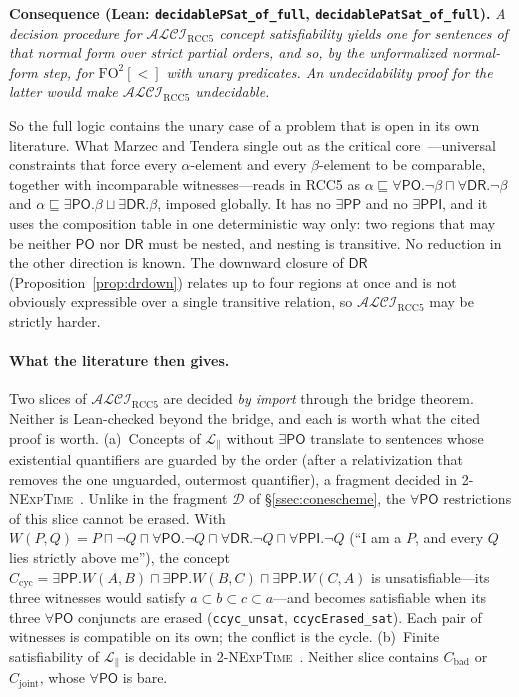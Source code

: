 \documentclass[11pt]{article}
\newcommand{\ALCIRCC}[1]{\mathcal{ALCI}_{\mathrm{RCC#1}}}
\newcommand{\DR}{\mathsf{DR}}
\newcommand{\PO}{\mathsf{PO}}
\newcommand{\PP}{\mathsf{PP}}
\newcommand{\PPI}{\mathsf{PPI}}
\newcommand{\code}[1]{\texttt{#1}}
\theoremstyle{plain}
\theoremstyle{definition}
\begin{document}
\medskip\noindent\textbf{Consequence (Lean:
\code{decidablePSat\_of\_full}, \code{decidablePatSat\_of\_full}).}
\emph{A decision procedure for $\ALCIRCC5$ concept satisfiability yields one
for sentences of that normal form over strict partial orders, and so, by the
unformalized normal-form step, for $\mathrm{FO}^2[<]$ with unary predicates.
An undecidability proof for the latter would make $\ALCIRCC5$
undecidable.}\medskip

So the full logic contains the unary case of a problem that is open in its own
literature. What Marzec and Tendera single out as the critical
core~\cite{MarzecTendera2026}---universal constraints that force every
$\alpha$-element and every $\beta$-element to be comparable, together with
incomparable witnesses---reads in RCC5 as
$\alpha\sqsubseteq\forall\PO.\neg\beta\sqcap\forall\DR.\neg\beta$ and
$\alpha\sqsubseteq\exists\PO.\beta\sqcup\exists\DR.\beta$, imposed globally. It
has no $\exists\PP$ and no $\exists\PPI$, and it uses the composition table in
one deterministic way only: two regions that may be neither $\PO$ nor $\DR$
must be nested, and nesting is transitive. No reduction in the other direction
is known. The downward closure of $\DR$ (Proposition~\ref{prop:drdown})
relates up to four regions at once and is not obviously expressible over a single
transitive relation, so $\ALCIRCC5$ may be strictly harder.

\paragraph{What the literature then gives.} Two slices of $\ALCIRCC5$ are
decided \emph{by import} through the bridge theorem. Neither is
Lean-checked beyond the bridge, and each is worth what the cited proof is
worth. (a)~Concepts of $\mathcal L_{\parallel}$ without $\exists\PO$ translate
to sentences whose existential quantifiers are guarded by the order (after a
relativization that removes the one unguarded, outermost quantifier), a
fragment decided in 2-\textsc{NExpTime}~\cite{SzwastTendera2018}. Unlike in the
fragment $\mathcal D$ of \S\ref{ssec:conescheme}, the $\forall\PO$
restrictions of this slice cannot be erased. With
$W(P,Q)=P\sqcap\neg Q\sqcap\forall\PO.\neg Q\sqcap\forall\DR.\neg Q\sqcap
\forall\PPI.\neg Q$ (``I am a $P$, and every $Q$ lies strictly above me''),
the concept
$C_{\mathrm{cyc}}=\exists\PP.W(A,B)\sqcap\exists\PP.W(B,C)\sqcap
\exists\PP.W(C,A)$ is unsatisfiable---its three witnesses would satisfy
$a\subset b\subset c\subset a$---and becomes satisfiable when its three
$\forall\PO$ conjuncts are erased (\code{ccyc\_unsat},
\code{ccycErased\_sat}). Each pair of witnesses is compatible on its own; the
conflict is the cycle. (b)~Finite satisfiability of $\mathcal L_{\parallel}$ is
decidable in 2-\textsc{NExpTime}~\cite{PrattHartmann2018}. Neither slice
contains $C_{\mathrm{bad}}$ or $C_{\mathrm{joint}}$, whose $\forall\PO$ is
bare.
\end{document}
